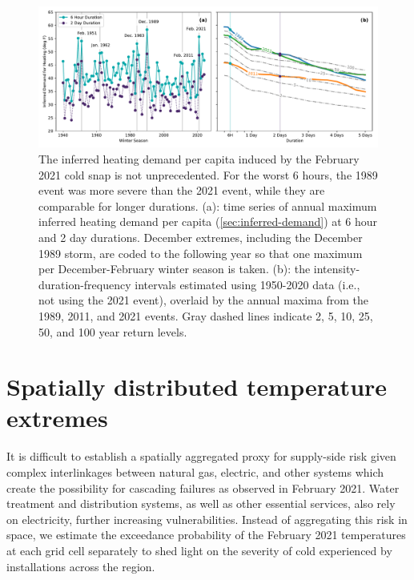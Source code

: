 \documentclass[12pt]{iopart}
\begin{document}
\begin{figure}
  \centering
  \includegraphics[width=\textwidth]{ERCOT_HDD_IDF_MLE_popweighted.pdf}
  \caption{
    The inferred heating demand per capita induced by the February 2021 cold snap is not unprecedented.
    For the worst 6 hours, the 1989 event was more severe than the 2021 event, while they are comparable for longer durations.
    (a): time series of annual maximum inferred heating demand per capita (\cref{sec:inferred-demand}) at 6 hour and 2 day durations.
    December extremes, including the December 1989 storm, are coded to the following year so that one maximum per December-February winter season is taken.
    (b): the intensity-duration-frequency intervals estimated using 1950-2020 data (i.e., not using the 2021 event), overlaid by the annual maxima from the 1989, 2011, and 2021 events.
    Gray dashed lines indicate 2, 5, 10, 25, 50, and 100 year return levels.
  }\label{fig:idf_weighted}
\end{figure}

\section{Spatially distributed temperature extremes}

It is difficult to establish a spatially aggregated proxy for supply-side risk given complex interlinkages between natural gas, electric, and other systems which create the possibility for cascading failures as observed in February 2021.
Water treatment and distribution systems, as well as other essential services, also rely on electricity, further increasing vulnerabilities.
Instead of aggregating this risk in space, we estimate the exceedance probability of the February 2021 temperatures at each grid cell separately to shed light on the severity of cold experienced by installations across the region.
\end{document}
